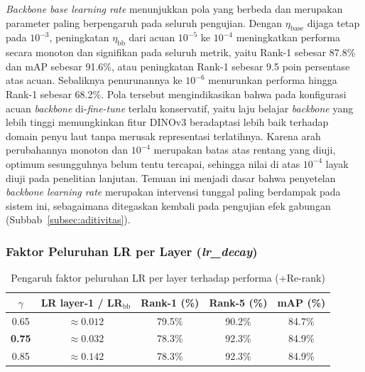 \textit{Backbone base learning rate} menunjukkan pola yang berbeda dan merupakan parameter paling berpengaruh pada seluruh pengujian. Dengan $\eta_{\text{base}}$ dijaga tetap pada $10^{-3}$, peningkatan $\eta_{\text{bb}}$ dari acuan $10^{-5}$ ke $10^{-4}$ meningkatkan performa secara monoton dan signifikan pada seluruh metrik, yaitu Rank-1 sebesar 87.8\% dan mAP sebesar 91.6\%, atau peningkatan Rank-1 sebesar 9.5 poin persentase atas acuan. Sebaliknya penurunannya ke $10^{-6}$ menurunkan performa hingga Rank-1 sebesar 68.2\%. Pola tersebut mengindikasikan bahwa pada konfigurasi acuan \textit{backbone} di-\textit{fine-tune} terlalu konservatif, yaitu laju belajar \textit{backbone} yang lebih tinggi memungkinkan fitur DINOv3 beradaptasi lebih baik terhadap domain penyu laut tanpa merusak representasi terlatihnya. Karena arah perubahannya monoton dan $10^{-4}$ merupakan batas atas rentang yang diuji, optimum sesungguhnya belum tentu tercapai, sehingga nilai di atas $10^{-4}$ layak diuji pada penelitian lanjutan. Temuan ini menjadi dasar bahwa penyetelan \textit{backbone learning rate} merupakan intervensi tunggal paling berdampak pada sistem ini, sebagaimana ditegaskan kembali pada pengujian efek gabungan (Subbab~\ref{subsec:aditivitas}).

\subsubsection{Faktor Peluruhan LR per Layer (\textit{lr\_decay})}

\begin{table}[H]
    \centering
    \caption{Pengaruh faktor peluruhan LR per layer terhadap performa (+Re-rank)}
    \label{tab:var_lrdecay}
    \renewcommand{\arraystretch}{1.25}
    \begin{tabular}{ccccc}
        \hline
        $\gamma$        & \textbf{LR layer-1 / LR$_{\text{bb}}$} & \textbf{Rank-1 (\%)} & \textbf{Rank-5 (\%)} & \textbf{mAP (\%)} \\
        \hline
        0{.}65          & $\approx 0{.}012$                      & 79.5\%               & 90.2\%               & 84.7\%            \\
        \textbf{0{.}75} & $\approx 0{.}032$                      & 78.3\%               & 92.3\%               & 84.9\%            \\
        0{.}85          & $\approx 0{.}142$                      & 78.3\%               & 92.3\%               & 84.9\%            \\
        \hline
    \end{tabular}
\end{table}

